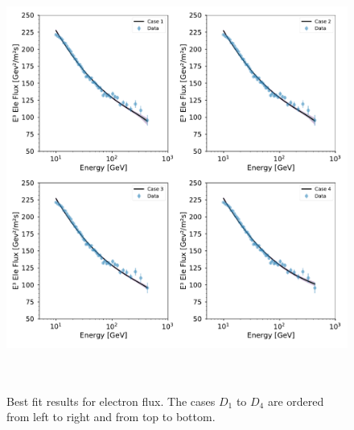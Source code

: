 \documentclass[a4paper,11pt]{article}
\begin{document}
\begin{figure}[htb]
\begin{center}
\includegraphics[height=14cm,width=14cm,angle=0]{Figures/pymultinest_fit_case_5_electron_flux.pdf}
\caption{Best fit results for electron flux. The cases $D_1$ to $D_4$ are ordered from left to right and from top to bottom.}
\label{fig:bf-electron-spectrum}
\end{center}
\end{figure}
\end{document}
